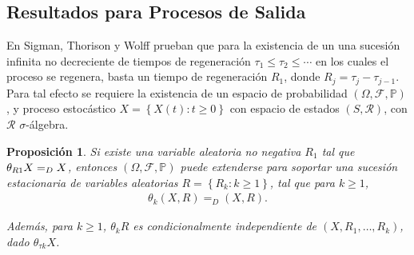 \documentclass{article}
\newtheorem{Prop}{Proposición}
\newcommand{\prob}{\mathbb{P}}
\begin{document}
\subsection{Resultados para Procesos de Salida}

En Sigman, Thorison y Wolff \cite{Sigman2} prueban que para la existencia de un una sucesi\'on infinita no decreciente de tiempos de regeneraci\'on $\tau_{1}\leq\tau_{2}\leq\cdots$ en los cuales el proceso se regenera, basta un tiempo de regeneraci\'on $R_{1}$, donde $R_{j}=\tau_{j}-\tau_{j-1}$. Para tal efecto se requiere la existencia de un espacio de probabilidad $\left(\Omega,\mathcal{F},\prob\right)$, y proceso estoc\'astico $\textit{X}=\left\{X\left(t\right):t\geq0\right\}$ con espacio de estados $\left(S,\mathcal{R}\right)$, con $\mathcal{R}$ $\sigma$-\'algebra.

\begin{Prop}
Si existe una variable aleatoria no negativa $R_{1}$ tal que $\theta_{R\footnotesize{1}}X=_{D}X$, entonces $\left(\Omega,\mathcal{F},\prob\right)$ puede extenderse para soportar una sucesi\'on estacionaria de variables aleatorias $R=\left\{R_{k}:k\geq1\right\}$, tal que para $k\geq1$,
\begin{eqnarray*}
\theta_{k}\left(X,R\right)=_{D}\left(X,R\right).
\end{eqnarray*}

Adem\'as, para $k\geq1$, $\theta_{k}R$ es condicionalmente independiente de $\left(X,R_{1},\ldots,R_{k}\right)$, dado $\theta_{\tau k}X$.

\end{Prop}
\end{document}
